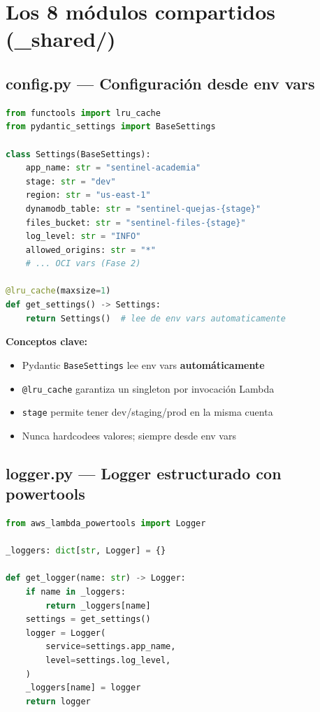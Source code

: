 \documentclass[11pt,a4paper,oneside]{article}
\newcommand{\ok}{\textcolor{okgreen}{\textbf{\checkmark}}}
\newcommand{\err}{\textcolor{errred}{\textbf{\ding{55}}}}
\begin{document}
\section{Los 8 m\'odulos compartidos (\_shared/)}

\subsection{config.py --- Configuraci\'on desde env vars}

\begin{lstlisting}[language=Python,caption={handlers/\_shared/config.py (resumen)}]
from functools import lru_cache
from pydantic_settings import BaseSettings

class Settings(BaseSettings):
    app_name: str = "sentinel-academia"
    stage: str = "dev"
    region: str = "us-east-1"
    dynamodb_table: str = "sentinel-quejas-{stage}"
    files_bucket: str = "sentinel-files-{stage}"
    log_level: str = "INFO"
    allowed_origins: str = "*"
    # ... OCI vars (Fase 2)

@lru_cache(maxsize=1)
def get_settings() -> Settings:
    return Settings()  # lee de env vars automaticamente
\end{lstlisting}

\textbf{Conceptos clave:}
\begin{itemize}
  \item \ok Pydantic \texttt{BaseSettings} lee env vars \textbf{autom\'aticamente}
  \item \ok \texttt{@lru\_cache} garantiza un singleton por invocaci\'on Lambda
  \item \ok \texttt{stage} permite tener dev/staging/prod en la misma cuenta
  \item \err Nunca hardcodees valores; siempre desde env vars
\end{itemize}

\subsection{logger.py --- Logger estructurado con powertools}

\begin{lstlisting}[language=Python,caption={handlers/\_shared/logger.py}]
from aws_lambda_powertools import Logger

_loggers: dict[str, Logger] = {}

def get_logger(name: str) -> Logger:
    if name in _loggers:
        return _loggers[name]
    settings = get_settings()
    logger = Logger(
        service=settings.app_name,
        level=settings.log_level,
    )
    _loggers[name] = logger
    return logger
\end{lstlisting}
\end{document}
